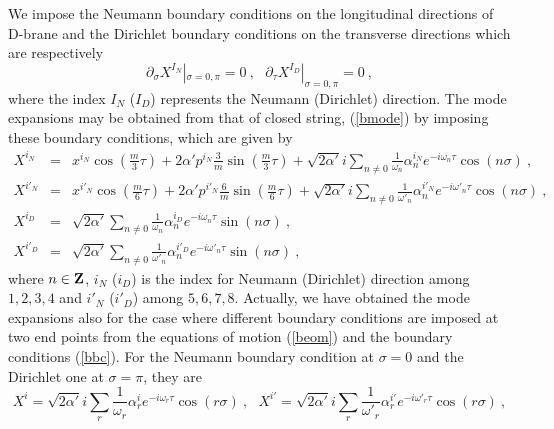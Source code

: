 \documentclass[a4paper,12pt]{article}
\begin{document}
We impose the Neumann boundary conditions on the longitudinal
directions of D-brane and the Dirichlet boundary conditions on the
transverse directions which are respectively
\begin{equation}
\partial_\sigma X^{I_N} |_{\sigma = 0, \pi} = 0 ~,~~~
\partial_\tau X^{I_D} |_{\sigma = 0, \pi} = 0 ~,
\label{bbc}
\end{equation}
where the index $I_N$ ($I_D$) represents the Neumann (Dirichlet)
direction.  The mode expansions may be obtained from that of closed
string, (\ref{bmode}) by imposing these boundary conditions, which are
given by
\begin{eqnarray}
X^{i_N} &=& x^{i_N} \cos \left( \frac{m}{3} \tau \right) 
        + 2 \alpha' p^{i_N} \frac{3}{m}
             \sin \left( \frac{m}{3} \tau \right) 
   + \sqrt{ 2 \alpha' } i \sum_{n \neq 0}
         \frac{1}{\omega_n} 
       \alpha^{i_N}_n e^{-i \omega_n \tau} \cos (n \sigma) ~,
                                      \nonumber \\
X^{i'_N} &=& x^{i'_N} \cos \left( \frac{m}{6} \tau \right) 
        + 2 \alpha' p^{i'_N} \frac{6}{m}
             \sin \left( \frac{m}{6} \tau \right) 
   + \sqrt{ 2 \alpha' } i \sum_{n \neq 0}
         \frac{1}{\omega'_n} 
       \alpha^{i'_N}_n e^{-i \omega'_n \tau} \cos (n \sigma) ~,
                                      \nonumber \\
X^{i_D} &=& \sqrt{ 2 \alpha' } \sum_{n \neq 0}
         \frac{1}{\omega_n} 
       \alpha^{i_D}_n e^{-i \omega_n \tau} \sin (n \sigma) ~,
                                      \nonumber \\
X^{i'_D} &=& \sqrt{ 2 \alpha' } \sum_{n \neq 0}
         \frac{1}{\omega'_n} 
       \alpha^{i'_D}_n e^{-i \omega'_n \tau} \sin (n \sigma) ~,
\label{obmode}
\end{eqnarray}
where $n \in {\bf Z}$, $i_N$ ($i_D$) is the index for Neumann
(Dirichlet) direction among $1,2,3,4$ and $i'_N$ ($i'_D$) among
$5,6,7,8$.  Actually, we have obtained the mode expansions also for
the case where different boundary conditions are imposed at two end
points from the equations of motion (\ref{beom}) and the boundary
conditions (\ref{bbc}).  For the Neumann boundary condition at
$\sigma=0$ and the Dirichlet one at $\sigma = \pi$, they are
\begin{equation}                   
X^i = \sqrt{ 2 \alpha' } i \sum_r
         \frac{1}{\omega_r} 
       \alpha^i_r e^{-i \omega_r \tau} \cos (r \sigma) ~,~~~
X^{i'} = \sqrt{ 2 \alpha' } i \sum_r
         \frac{1}{\omega'_r} 
       \alpha^{i'}_r e^{-i \omega'_r \tau} \cos (r \sigma) ~,
\label{obmode1}
\end{equation}
\end{document}
